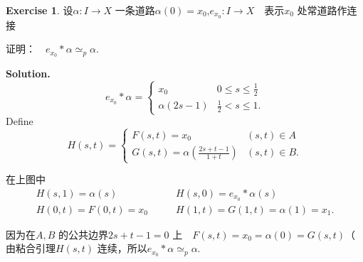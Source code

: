 \documentclass[a4paper]{book}
\newenvironment{solution}%
{\noindent\textbf{Solution.}}%
{\qedhere}
\numberwithin{equation}{chapter}
\theoremstyle{definition}
\newtheorem{exc}[exm]{Exercise}
\begin{document}
\begin{multicols}{2}
\setlength{\columnseprule}{0.2pt}  

\begin{exc}
设$ \alpha : I \rightarrow X $ 一条道路$ \alpha(0) = x_0 $,$ e_{x_0} : I \rightarrow X $　表示$ x_0 $ 处常道路作连接

证明：　$ e_{x_0} * \alpha \simeq_p \alpha $.
\end{exc}

\begin{solution} 
	\begin{equation}
		 e_{x_0} * \alpha = 
		 \begin{cases}
		 x_0     \qquad & 0 \leq s \leq \frac{1}{2}\\
		 \alpha(2s-1)   & \frac{1}{2} < s \leq 1.
		 \end{cases}
	\end{equation}
	Define \begin{equation}
	H(s,t) = \begin{cases}
	F(s,t) = x_0   \qquad & (s,t) \in A \\
	G(s,t) = \alpha(\frac{2s +t -1}{1+t})    & (s,t) \in B.
	\end{cases}
	\end{equation}

在上图中
\begin{equation}\nonumber
	\begin{aligned}
	H(s,1) = \alpha(s) \qquad  &H(s,0) = e_{x_0} * \alpha(s) \\
	H(0,t) = F(0,t) = x_0 \qquad &H(1,t) = G(1,t) = \alpha(1) = x_1.
	\end{aligned}
\end{equation}

因为在$ A,B $ 的公共边界$ 2s + t -1 = 0 $ 上　$ F(s,t) = x_0 = \alpha(0) = G(s,t)（$
由粘合引理$ H(s,t) $ 连续，所以$ e_{x_0} * \alpha \simeq_p \alpha $.




\end{solution}
\end{multicols}
\end{document}
